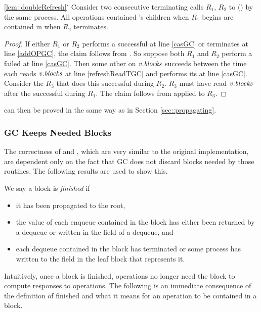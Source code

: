 \begin{customlemma}{\ref{lem::doubleRefresh}$'$}\label{lem::doubleRefreshGC}
Consider two consecutive terminating calls $R_1$, $R_2$ to () by the same process.
All operations contained 's children when $R_1$ begins
are contained in  when $R_2$ terminates.
\end{customlemma}
\begin{proof}
If either $R_1$ or $R_2$ performs a successful  at line \ref{casGC} or terminates at line \ref{addOPGC}, the claim follows
from .
So suppose both $R_1$ and $R_2$ perform a failed  at line \ref{casGC}.
Then some other  on $\mbox{\textnormal{\textit{v}}}.\mbox{\textit{blocks}}$ succeeds between the time each 
reads $\mbox{\textnormal{\textit{v}}}.\mbox{\textit{blocks}}$ at line \ref{refreshReadTGC} and performs its  at line \ref{casGC}.
Consider the  $R_3$ that does this successful  during $R_2$.
$R_3$ must have read $\mbox{\textnormal{\textit{v}}}.\mbox{\textit{blocks}}$ after the successful  during $R_1$.
The claim follows from  applied to $R_3$.
\end{proof}

 can then be proved in the same way as in Section \ref{sec::propagating}.


\subsubsection{GC Keeps Needed Blocks}

The correctness of  and , which are very similar to the 
original implementation, are dependent only on the fact that GC does not 
discard blocks needed by those routines.
The following results are used to show this.

We say a block is \emph{finished} if 
\begin{itemize}
\item
it has been propagated to the root,
\item
the value of each enqueue contained in the block has either been returned by a dequeue
or written in the  field of a dequeue, and
\item
each dequeue contained in the block has terminated or some process has written to the  field in the leaf block that represents it.
\end{itemize}
Intuitively, once a block is finished, operations no longer need  the block
to compute responses to operations.
The following is an immediate consequence of the definition of finished and what it means for an operation to be contained in a block.

